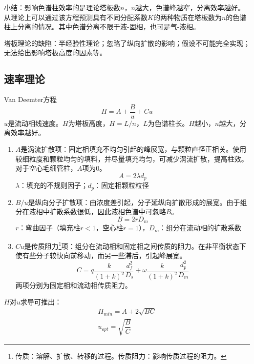 小结：影响色谱柱效率的是理论塔板数$n$，$n$越大，色谱峰越窄，分离效率越好。从理论上可以通过该方程预测具有不同分配系数$K$的两种物质在塔板数为$n$的色谱柱上分离的情况。其中色谱分离不限于液-固相，也可是气-液相。

塔板理论的缺陷：半经验性理论；忽略了纵向扩散的影响；假设不可能完全实现；无法给出影响塔板高度的因素等。

\subsection{速率理论}

\begin{theorem*}{Van Deemter方程}{}
	\begin{equation*}
		H=A+\dfrac{B}{u}+Cu
	\end{equation*}
	$u$是流动相线速度。$H$为塔板高度，$H=L/n$，$L$为色谱柱长。$H$越小，$n$越大，分离效率越好。
\end{theorem*}

\begin{enumerate}
	\item $A$是涡流扩散项：固定相填充不均匀引起的峰展宽，与颗粒直径正相关。使用较细粒度和颗粒均匀的填料，并尽量填充均匀，可减少涡流扩散，提高柱效。对于空心毛细管柱，$A$项为$0$。
	\begin{equation*}
		A=2\lambda d_p
	\end{equation*}
	$\lambda$：填充的不规则因子；$d_p$：固定相颗粒粒径
	\item $B/u$是纵向分子扩散项：由浓度差引起，分子延纵向扩散形成的展宽。由于组分在液相中扩散系数很低，因此液相色谱中可忽略$B$。
	\begin{equation*}
		B=2rD_m
	\end{equation*}
	$r$：弯曲因子（填充柱$r<1$，空心柱$r=1$），$D_m$：组分在流动相的扩散系数
	\item $Cu$是传质阻力\footnote{传质：溶解、扩散、转移的过程。传质阻力：影响传质过程的阻力。}项：组分在流动相和固定相之间传质的阻力。在非平衡状态下使有些分子较快向前移动，而另一些滞后，引起峰展宽。
	\begin{equation*}
		C=q\dfrac{k}{(1+k)^2}\dfrac{d_f^2}{D_s}+\omega\dfrac{k}{(1+k)^2}\dfrac{d_p^2}{D_m}
	\end{equation*}
	两项分别为固定相和流动相传质阻力。
\end{enumerate}

$H$对$u$求导可推出：
\begin{gather*}
	H_{min}=A+2\sqrt{BC}\\
	u_{opt}=\sqrt{\dfrac{B}{C}}
\end{gather*}

